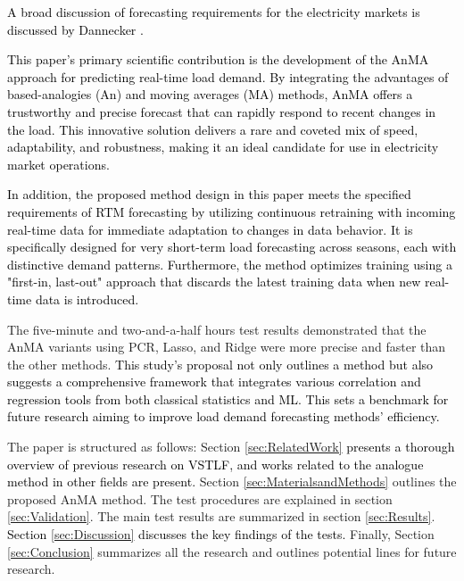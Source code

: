 \documentclass[journal, twoside]{IEEEtran}
\begin{document}
\textcolor{black}{A broad discussion of forecasting requirements for the electricity
markets is discussed by Dannecker \cite{Dannecker2015}.} %

\textcolor{black}{This paper's primary scientific contribution is the development of the \ac{AnMA} approach for predicting real-time load demand. By integrating the advantages of based-analogies (An) and moving averages (MA) methods, \ac{AnMA} offers a trustworthy and precise forecast that can rapidly respond to recent changes in the load. This innovative solution delivers a rare and coveted mix of speed, adaptability, and robustness, making it an ideal candidate for use in electricity market operations.}

\textcolor{black}{In addition, the proposed method design in this paper meets the specified requirements of \ac{RTM} forecasting by utilizing continuous retraining with incoming real-time data for immediate adaptation to changes in data behavior. It is specifically designed for very short-term load forecasting across seasons, each with distinctive demand patterns. Furthermore, the method optimizes training using a "first-in, last-out" approach that discards the latest training data when new real-time data is introduced.}


The five-minute and two-and-a-half hours test results demonstrated that the \ac{AnMA} variants using \ac{PCR}, Lasso, and Ridge were more precise and faster than the other methods.
\textcolor{black}{This study's proposal not only outlines a method but also suggests a comprehensive framework that integrates various correlation and regression tools from both classical statistics and \ac{ML}. This sets a benchmark for future research aiming to improve load demand forecasting methods' efficiency.}

The paper is structured as follows: Section \ref{sec:RelatedWork} \textcolor{black}{presents a thorough overview of previous research on \ac{VSTLF}, and works related to the analogue method in other fields are present.} Section \ref{sec:MaterialsandMethods} outlines the proposed \ac{AnMA} method. The test procedures are explained in section \ref{sec:Validation}. The main test results are summarized in section \ref{sec:Results}. \textcolor{black}{Section \ref{sec:Discussion} discusses the key findings of the tests.} Finally, Section \ref{sec:Conclusion} summarizes all the research and outlines potential lines for future research.
\end{document}
